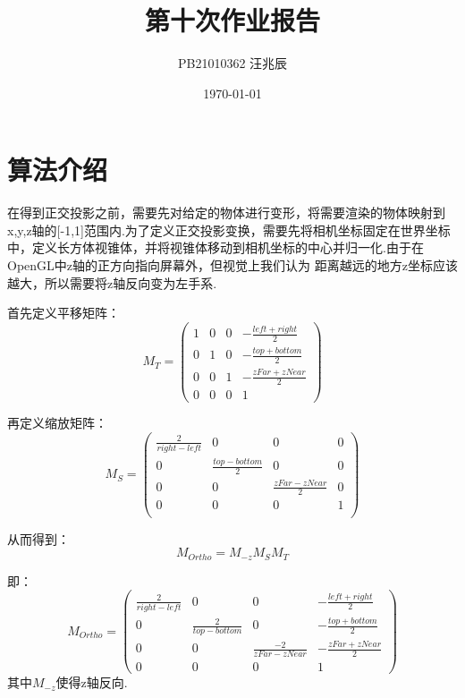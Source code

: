 \documentclass[12pt]{article}
\title{第十次作业报告}
\author{PB21010362 汪兆辰}
\date{\today}
\begin{document}
\maketitle

\section{算法介绍}
在得到正交投影之前，需要先对给定的物体进行变形，将需要渲染的物体映射到x,y,z轴的[-1,1]范围内.为了定义正交投影变换，需要先将相机坐标固定在世界坐标中，定义长方体视锥体，并将视锥体移动到相机坐标的中心并归一化.由于在OpenGL中z轴的正方向指向屏幕外，但视觉上我们认为
距离越远的地方z坐标应该越大，所以需要将z轴反向变为左手系.

首先定义平移矩阵：
\begin{equation}
    M_T=
    \begin{pmatrix}
        1&0&0&-\frac{left+right}{2}\\
        0&1&0&-\frac{top+bottom}{2}\\
        0&0&1&-\frac{zFar+zNear}{2}\\
        0&0&0&1
    \end{pmatrix}
\end{equation}

再定义缩放矩阵：
\begin{equation}
    M_S=
    \begin{pmatrix}
        \frac{2}{right-left}&0&0&0\\
        0&\frac{top-bottom}{2}&0&0\\
        0&0&\frac{zFar-zNear}{2}&0\\
        0&0&0&1\\
    \end{pmatrix}
\end{equation}

从而得到：
\begin{equation}
    M_{Ortho}=M_{-z}M_S M_T
\end{equation}

即：
\begin{equation}
    M_{Ortho}=\begin{pmatrix}
        \frac{2}{right-left}&0&0&-\frac{left+right}{2}\\
        0&\frac{2}{top-bottom}&0&-\frac{top+bottom}{2}\\
        0&0&\frac{-2}{zFar-zNear}&-\frac{zFar+zNear}{2}\\
        0&0&0&1
    \end{pmatrix}
\end{equation}
其中$M_{-z}$使得z轴反向.
\end{document}
